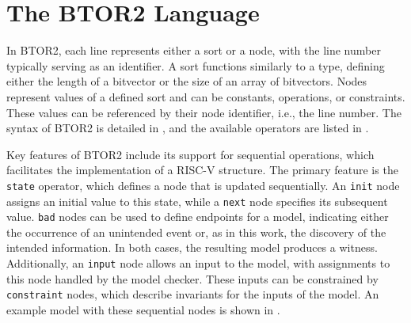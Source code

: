 \section{The BTOR2 Language}
In BTOR2, each line represents either a sort or a node, with the line
number typically serving as an identifier. A sort functions similarly
to a type, defining either the length of a bitvector or the size of
an array of bitvectors. Nodes represent values of a defined sort and
can be constants, operations, or constraints. These values can be
referenced by their node identifier, i.e., the line number. The
syntax of BTOR2 is detailed in \cite[Figure 1]{btor2}, and the
available operators are listed in \cite[Table 1]{btor2}.

Key features of BTOR2 include its support for sequential operations,
which facilitates the implementation of a RISC-V structure. The
primary feature is the \texttt{state} operator, which defines a node
that is updated sequentially. An \texttt{init} node assigns an
initial value to this state, while a \texttt{next} node specifies its
subsequent value. \texttt{bad} nodes can be used to define endpoints
for a model, indicating either the occurrence of an unintended event
or, as in this work, the discovery of the intended information. In
both cases, the resulting model produces a witness. Additionally, an
\texttt{input} node allows an input to the model, with assignments to
this node handled by the model checker. These inputs can be
constrained by \texttt{constraint} nodes, which describe invariants
for the inputs of the model. An example model with these sequential
nodes is shown in .
